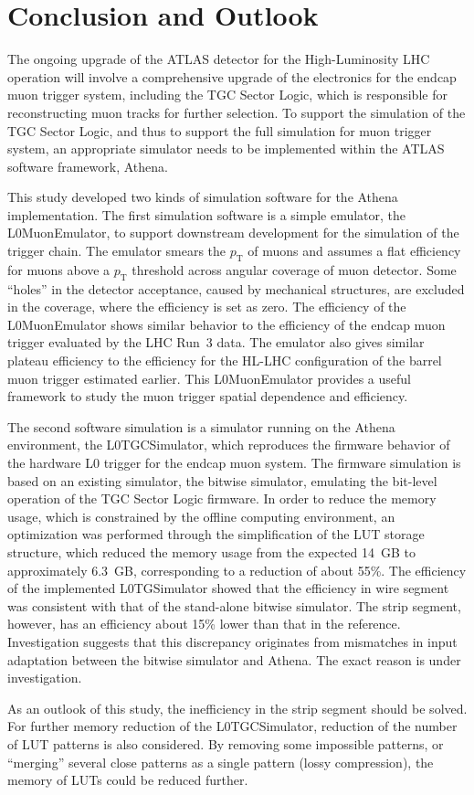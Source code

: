 \chapter{Conclusion and Outlook} \label{ch:conclusion}
The ongoing upgrade of the ATLAS detector for the High-Luminosity LHC operation will involve a comprehensive upgrade of the electronics for the endcap muon trigger system, including the TGC Sector Logic, which is responsible for reconstructing muon tracks for further selection. To support the simulation of the TGC Sector Logic, and thus to support the full simulation for muon trigger system, an appropriate simulator needs to be implemented within the ATLAS software framework, Athena.

This study developed two kinds of simulation software for the Athena implementation. The first simulation software is a simple emulator, the L0MuonEmulator, to support downstream development for the simulation of the trigger chain. The emulator smears the $p_{\mathrm{T}}$ of muons and assumes a flat efficiency for muons above a $p_{\mathrm{T}}$ threshold across angular coverage of muon detector. Some ``holes'' in the detector acceptance, caused by mechanical structures, are excluded in the coverage, where the efficiency is set as zero. The efficiency of the L0MuonEmulator shows similar behavior to the efficiency of the endcap muon trigger evaluated by the LHC Run~3 data. The emulator also gives similar plateau efficiency to the efficiency for the HL-LHC configuration of the barrel muon trigger estimated earlier. This L0MuonEmulator provides a useful framework to study the muon trigger spatial dependence and efficiency.

The second software simulation is a simulator running on the Athena environment, the L0TGCSimulator, which reproduces the firmware behavior of the hardware L0 trigger for the endcap muon system. The firmware simulation is based on an existing simulator, the bitwise simulator, emulating the bit-level operation of the TGC Sector Logic firmware. In order to reduce the memory usage, which is constrained by the offline computing environment, an optimization was performed through the simplification of the LUT storage structure, which reduced the memory usage from the expected 14~GB to approximately 6.3~GB, corresponding to a reduction of about 55\%. The efficiency of the implemented L0TGSimulator showed that the efficiency in wire segment was consistent with that of the stand-alone bitwise simulator. The strip segment, however, has an efficiency about 15\% lower than that in the reference. Investigation suggests that this discrepancy originates from mismatches in input adaptation between the bitwise simulator and Athena. The exact reason is under investigation.

As an outlook of this study, the inefficiency in the strip segment should be solved. For further memory reduction of the L0TGCSimulator, reduction of the number of LUT patterns is also considered. By removing some impossible patterns, or ``merging'' several close patterns as a single pattern (lossy compression), the memory of LUTs could be reduced further.
